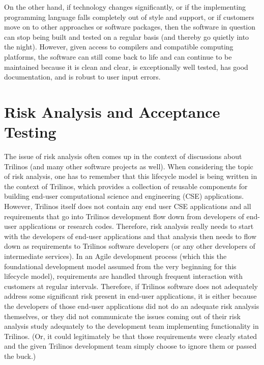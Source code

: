 \documentclass[11pt]{SANDreport}
\begin{document}
On the other hand, if technology changes significantly, or if the
implementing programming language falls completely out of style and
support, or if customers move on to other approaches or software
packages, then the software in question can stop being built and
tested on a regular basis (and thereby go quietly into the night).
However, given access to compilers and compatible computing
platforms, the software can still come back to life and can continue
to be maintained because it is clean and clear, is exceptionally well
tested, has good documentation, and is robust to user input errors.


%
{}\section{Risk Analysis and Acceptance Testing}
\label{sec:risk_analysis_acceptance_testing}
%

The issue of risk analysis often comes up in the context of discussions
about Trilinos (and many other software projects as well).  When
considering the topic of risk analysis, one has to remember that this
lifecycle model is being written in the context of Trilinos, which
provides a collection of reusable components for building end-user
computational science and engineering (CSE) applications.  However,
Trilinos itself does not contain any end user CSE applications and all
requirements that go into Trilinos development flow down from
developers of end-user applications or research codes.  Therefore,
risk analysis really needs to start with the developers of end-user
applications and that analysis then needs to flow down as requirements
to Trilinos software developers (or any other developers of
intermediate services).  In an Agile development process (which this
the foundational development model assumed from the very beginning for
this lifecycle model), requirements are handled through frequent
interaction with customers at regular intervals.  Therefore, if
Trilinos software does not adequately address some significant risk
present in end-user applications, it is either because the developers
of those end-user applications did not do an adequate risk analysis
themselves, or they did not communicate the issues coming out of their
risk analysis study adequately to the development team implementing
functionality in Trilinos.  (Or, it could legitimately be that those
requirements were clearly stated and the given Trilinos development
team simply choose to ignore them or passed the buck.)
\end{document}
